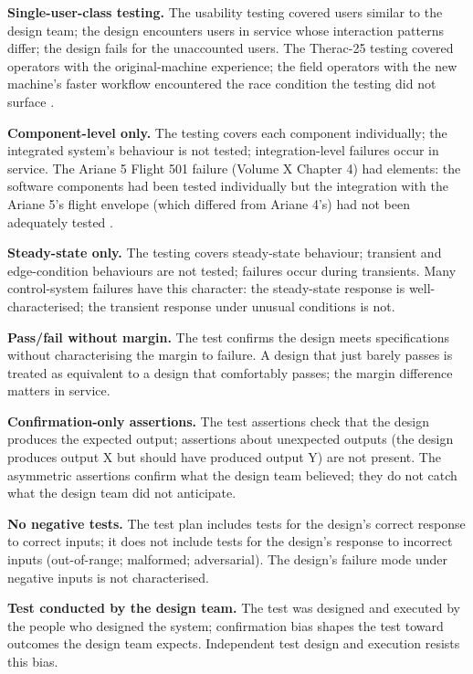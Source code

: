 \textbf{Single-user-class testing.} The usability testing covered users similar to the design team; the design encounters users in service whose interaction patterns differ; the design fails for the unaccounted users. The Therac-25 testing covered operators with the original-machine experience; the field operators with the new machine's faster workflow encountered the race condition the testing did not surface \cite{paper:leveson-turner1993}.

\textbf{Component-level only.} The testing covers each component individually; the integrated system's behaviour is not tested; integration-level failures occur in service. The Ariane 5 Flight 501 failure (Volume X Chapter 4) had elements: the software components had been tested individually but the integration with the Ariane 5's flight envelope (which differed from Ariane 4's) had not been adequately tested \cite{acc:ariane501-ifr}.

\textbf{Steady-state only.} The testing covers steady-state behaviour; transient and edge-condition behaviours are not tested; failures occur during transients. Many control-system failures have this character: the steady-state response is well-characterised; the transient response under unusual conditions is not.

\textbf{Pass/fail without margin.} The test confirms the design meets specifications without characterising the margin to failure. A design that just barely passes is treated as equivalent to a design that comfortably passes; the margin difference matters in service.

\textbf{Confirmation-only assertions.} The test assertions check that the design produces the expected output; assertions about unexpected outputs (the design produces output X but should have produced output Y) are not present. The asymmetric assertions confirm what the design team believed; they do not catch what the design team did not anticipate.

\textbf{No negative tests.} The test plan includes tests for the design's correct response to correct inputs; it does not include tests for the design's response to incorrect inputs (out-of-range; malformed; adversarial). The design's failure mode under negative inputs is not characterised.

\textbf{Test conducted by the design team.} The test was designed and executed by the people who designed the system; confirmation bias shapes the test toward outcomes the design team expects. Independent test design and execution resists this bias.

